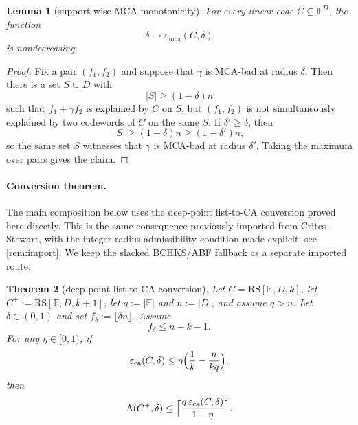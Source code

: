 \documentclass[11pt]{article}
\newtheorem{theorem}{Theorem}[section]
\newtheorem{lemma}[theorem]{Lemma}
\theoremstyle{definition}
\theoremstyle{remark}
\newcommand{\F}{\mathbb{F}}
\newcommand{\RS}{\mathrm{RS}}
\newcommand{\eca}{\varepsilon_{\mathrm{ca}}}
\newcommand{\emca}{\varepsilon_{\mathrm{mca}}}
\newcommand{\Lst}{\Lambda}
\begin{document}
\begin{lemma}[support-wise MCA monotonicity]\label{lem:mca-monotone}
For every linear code $C\subseteq\F^D$, the function
\[
        \delta\longmapsto \emca(C,\delta)
\]
is nondecreasing.
\end{lemma}

\begin{proof}
Fix a pair $(f_1,f_2)$ and suppose that $\gamma$ is MCA-bad at radius $\delta$. Then there is a set $S\subseteq D$ with
\[
        |S|\ge (1-\delta)n
\]
such that $f_1+\gamma f_2$ is explained by $C$ on $S$, but $(f_1,f_2)$ is not simultaneously explained by two codewords of $C$ on the same $S$. If $\delta'\ge\delta$, then
\[
        |S|\ge (1-\delta)n\ge (1-\delta')n,
\]
so the same set $S$ witnesses that $\gamma$ is MCA-bad at radius $\delta'$. Taking the maximum over pairs gives the claim.
\end{proof}

\paragraph{Conversion theorem.} The main composition below uses the deep-point list-to-CA conversion proved here directly. This is the same consequence previously imported from Crites--Stewart, with the integer-radius admissibility condition made explicit; see \cref{rem:import}. We keep the slacked BCHKS/ABF fallback as a separate imported route.

\begin{theorem}[deep-point list-to-CA conversion]
\label{thm:A}
Let $C=\RS[\F,D,k]$, let $C^+:=\RS[\F,D,k+1]$, let
$q:=|\F|$ and $n:=|D|$, and assume $q>n$.  Let $\delta\in(0,1)$ and set
$f_\delta:=\lfloor \delta n\rfloor$.  Assume
\[
        f_\delta \le n-k-1 .
\]
For any $\eta\in[0,1)$, if
\[
        \eca(C,\delta)
        \le
        \eta\Bigl(\frac1k-\frac n{kq}\Bigr),
\]
then
\[
        \Lst(C^+,\delta)
        \le
        \Bigl\lceil
        \frac{q\,\eca(C,\delta)}{1-\eta}
        \Bigr\rceil .
\]
\end{theorem}
\end{document}
